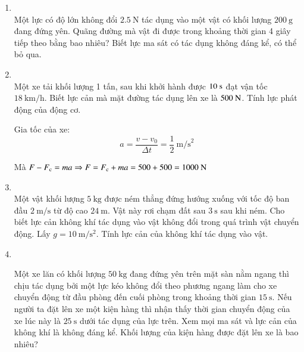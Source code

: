 \begin{enumerate}[label=\bfseries Bài \arabic*:,leftmargin=1.5cm]
{	}

\item {}\\
Một lực có độ lớn không đổi $\SI{2.5}{\newton}$ tác dụng vào một vật có khối lượng $\SI{200}{\gram}$ đang đứng yên. Quãng đường mà vật đi được trong khoảng thời gian 4 giây tiếp theo bằng bao nhiêu? Biết lực ma sát có tác dụng không đáng kể, có thể bỏ qua.

\item {}\\
{Một xe tải khối lượng 1 tấn, sau khi khởi hành được $10\ \text s$ đạt vận tốc $18\ \text{km/h}$. Biết lực cản mà mặt đường tác dụng lên xe là $500\ \text N$. Tính lực phát động của động cơ.
}

\hideall
{	Gia tốc của xe:
	\[a = \dfrac{v-v_0}{\Delta t} = \dfrac{1}{2}\ \text{m/s}^2\]
	
	Mà $F-F_\text c = ma \Rightarrow F = F_\text c + ma = 500 + 500 = 1000\ \text N$
}

\item {}\\
Một vật khối lượng $\SI{5}{\kilogram}$ được ném thẳng đứng hướng xuống với tốc độ ban đầu $\SI{2}{\meter/\second}$ từ độ cao $\SI{24}{\meter}$. Vật này rơi chạm đất sau $\SI{3}{\second}$ sau khi ném. Cho biết lực cản không khí tác dụng vào vật không đổi trong quá trình vật chuyển động. Lấy $g=\SI{10}{\meter/\second^2}$. Tính lực cản của không khí tác dụng vào vật.

\item {}\\
{Một xe lăn có khối lượng $\SI{50}{\kilogram}$ đang đứng yên trên mặt sàn nằm ngang thì chịu tác dụng bởi một lực kéo không đổi theo phương ngang làm cho xe chuyển động từ đầu phòng đến cuối phòng trong khoảng thời gian $\SI{15}{\second}$. Nếu người ta đặt lên xe một kiện hàng thì nhận thấy thời gian chuyển động của xe lúc này là $\SI{25}{\second}$ dưới tác dụng của lực trên. Xem mọi ma sát và lực cản của không khí là không đáng kể. Khối lượng của kiện hàng được đặt lên xe là bao nhiêu?

}
\end{enumerate}
